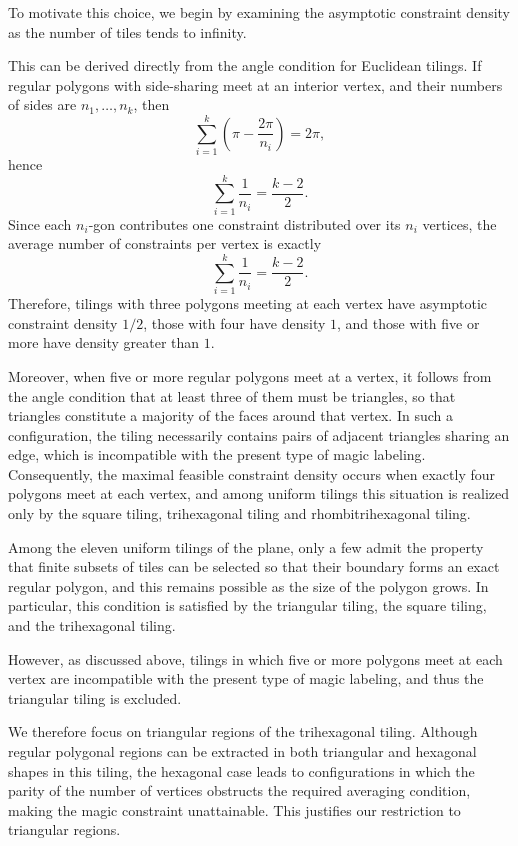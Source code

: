 \documentclass[11pt]{article}
\theoremstyle{plain}
\theoremstyle{definition}
\begin{document}
To motivate this choice, we begin by examining the asymptotic constraint density as the number of tiles tends to infinity.

This can be derived directly from the angle condition for Euclidean tilings. 
If regular polygons with side-sharing meet at an interior vertex, and their 
numbers of sides are $n_1,\dots,n_k$, then
\[
\sum_{i=1}^k \left(\pi - \frac{2\pi}{n_i}\right) = 2\pi,
\]
hence
\[
\sum_{i=1}^k \frac{1}{n_i} = \frac{k-2}{2}.
\]
Since each $n_i$-gon contributes one constraint distributed over its $n_i$ vertices, 
the average number of constraints per vertex is exactly
\[
\sum_{i=1}^k \frac{1}{n_i} = \frac{k-2}{2}.
\]
Therefore, tilings with three polygons meeting at each vertex have asymptotic 
constraint density $1/2$, those with four have density $1$, and those with five 
or more have density greater than $1$.

Moreover, when five or more regular polygons meet at a vertex, it follows from the angle condition that at least three of them must be triangles, so that triangles constitute a majority of the faces around that vertex. In such a configuration, the tiling necessarily contains pairs of adjacent triangles sharing an edge, which is incompatible with the present type of magic labeling. Consequently, the maximal feasible constraint density occurs when exactly four polygons meet at each vertex, and among uniform tilings this situation is realized only by the square tiling, trihexagonal tiling and rhombitrihexagonal tiling.

Among the eleven uniform tilings of the plane, only a few admit the property that finite subsets of tiles can be selected so that their boundary forms an exact regular polygon, and this remains possible as the size of the polygon grows. In particular, this condition is satisfied by the triangular tiling, the square tiling, and the trihexagonal tiling.

However, as discussed above, tilings in which five or more polygons meet at each vertex are incompatible with the present type of magic labeling, and thus the triangular tiling is excluded.

We therefore focus on triangular regions of the trihexagonal tiling. Although regular polygonal regions can be extracted in both triangular and hexagonal shapes in this tiling, the hexagonal case leads to configurations in which the parity of the number of vertices obstructs the required averaging condition, making the magic constraint unattainable. This justifies our restriction to triangular regions.
\end{document}

